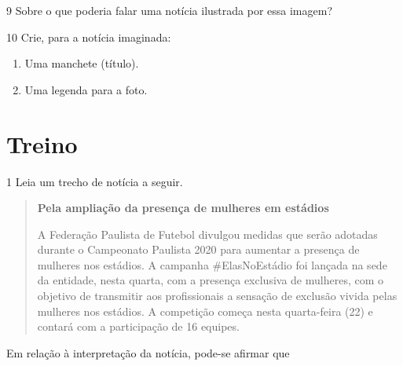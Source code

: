 \num{9} Sobre o que poderia falar uma notícia ilustrada por essa imagem?


\num{10} Crie, para a notícia imaginada:

\begin{enumerate}
\item
  Uma manchete (título).
\item
  Uma legenda para a foto.
\end{enumerate}


\section{Treino}

\num{1} Leia um trecho de notícia a seguir.

\begin{quote}
\textbf{Pela ampliação da presença de mulheres em estádios}


A Federação Paulista de Futebol divulgou medidas que serão adotadas
durante o Campeonato Paulista 2020 para aumentar a presença de mulheres
nos estádios. A campanha \#ElasNoEstádio foi lançada na sede da
entidade, nesta quarta, com a presença exclusiva de mulheres, com o
objetivo de transmitir aos profissionais a sensação de exclusão vivida
pelas mulheres nos estádios. A competição começa nesta quarta-feira (22)
e contará com a participação de 16 equipes.

\end{quote}

Em relação à interpretação da notícia, pode-se afirmar que

